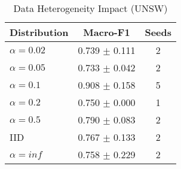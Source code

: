 \begin{table}[htbp]
\centering
\caption{Data Heterogeneity Impact (UNSW)}\label{tab:hetero_unsw}
\begin{tabular}{lcc}
\toprule
Distribution & Macro-F1 & Seeds \\
\midrule
$\alpha=0.02$ & 0.739 $\pm$ 0.111 & 2 \\
$\alpha=0.05$ & 0.733 $\pm$ 0.042 & 2 \\
$\alpha=0.1$ & 0.908 $\pm$ 0.158 & 5 \\
$\alpha=0.2$ & 0.750 $\pm$ 0.000 & 1 \\
$\alpha=0.5$ & 0.790 $\pm$ 0.083 & 2 \\
IID & 0.767 $\pm$ 0.133 & 2 \\
$\alpha=inf$ & 0.758 $\pm$ 0.229 & 2 \\
\bottomrule
\end{tabular}
\end{table}
